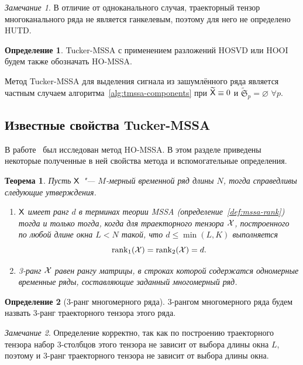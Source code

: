 \documentclass[specialist,
  substylefile = spbu.rtx,
subf,href,colorlinks=true, 12pt]{disser}
\theoremstyle{plain}
\newtheorem{theorem}{Теорема}[section]
\theoremstyle{definition}
\newtheorem{definition}{Определение}[section]
\theoremstyle{remark}
\newtheorem{remark}{Замечание}[section]
\def\newdecomp/{HUTD}
\def\tmssa/{Tucker-MSSA}
\begin{document}
\begin{remark}
  В отличие от одноканального случая, траекторный тензор
  многоканального ряда не является ганкелевым, поэтому для него не
  определено \newdecomp/.
\end{remark}

\begin{definition}
  \tmssa/ с применением разложений HOSVD или HOOI будем также
  обозначать HO-MSSA.
\end{definition}

Метод \tmssa/ для выделения сигнала из зашумлённого ряда является
частным случаем алгоритма~\ref{alg:tmssa-components} при
$\widetilde{\mathsf{X}} \equiv 0$ и $\widetilde{\mathfrak{S}}_p = \varnothing$
$\forall p$.

\subsection{Известные свойства \tmssa/}
В работе~\cite{Thesis2024} был исследован
метод HO-MSSA. В этом разделе приведены некоторые полученные в ней свойства
метода и вспомогательные определения.

\begin{theorem}
  \label{state:hosvd-mssa-rang}
  Пусть $\mathsf{X}$ "--- $M$-мерный временной ряд длины $N$, тогда
  справедливы следующие утверждения.
  \begin{enumerate}
    \item $\mathsf{X}$ имеет ранг $d$ в терминах теории MSSA
      (определение~\ref{def:mssa-rank})
      тогда и только тогда, когда для траекторного тензора $\mathcal{X}$,
      построенного по любой длине окна
      $L<N$ такой, что $d \leqslant\min(L, K)$ выполняется
      \[\operatorname{rank}_1(\mathcal{X}) = \operatorname{rank}_2(\mathcal{X}) = d.\]
    \item 3-ранг $\mathcal{X}$ равен рангу матрицы,
      в строках которой содержатся одномерные временные ряды,
      составляющие заданный
      многомерный ряд.
  \end{enumerate}
\end{theorem}

\begin{definition}[3-ранг многомерного ряда]
  3-рангом многомерного ряда будем назвать 3-ранг траекторного
  тензора этого ряда.
\end{definition}
\begin{remark}
  Определение корректно, так как по построению траекторного тензора
  набор 3-столбцов этого тензора
  не зависит от выбора длины окна $L$, поэтому и $3$-ранг
  траекторного тензора не зависит от выбора
  длины окна.
\end{remark}
\end{document}

